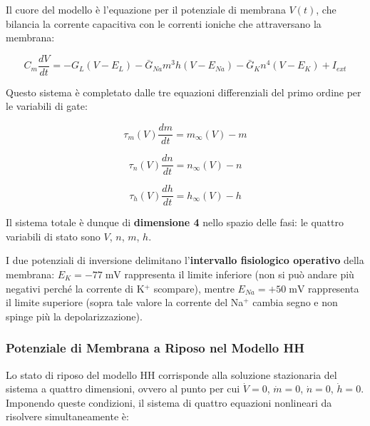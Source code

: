 Il cuore del modello è l'equazione per il potenziale di membrana $V(t)$, che bilancia la corrente capacitiva con le correnti ioniche che attraversano la membrana:

\begin{equation}
C_m \frac{dV}{dt} = -G_L(V - E_L) - \bar{G}_{Na} m^3 h (V - E_{Na}) - \bar{G}_K n^4 (V - E_K) + I_{ext}
\end{equation}

Questo sistema è completato dalle tre equazioni differenziali del primo ordine per le variabili di gate:

\begin{equation}
\tau_m(V) \frac{dm}{dt} = m_\infty(V) - m
\end{equation}

\begin{equation}
\tau_n(V) \frac{dn}{dt} = n_\infty(V) - n
\end{equation}

\begin{equation}
\tau_h(V) \frac{dh}{dt} = h_\infty(V) - h
\end{equation}

Il sistema totale è dunque di \textbf{dimensione 4} nello spazio delle fasi: le quattro variabili di stato sono $V$, $n$, $m$, $h$.



\begin{tcolorbox}[colback=gray!5, colframe=gray!40, arc=2mm, boxrule=0.5pt]
I due potenziali di inversione delimitano l'\textbf{intervallo fisiologico operativo} della membrana: $E_K = -77 \; \text{mV}$ rappresenta il limite inferiore (non si può andare più negativi perché la corrente di K$^+$ scompare), mentre $E_{Na} = +50 \; \text{mV}$ rappresenta il limite superiore (sopra tale valore la corrente del Na$^+$ cambia segno e non spinge più la depolarizzazione).
\end{tcolorbox}

\subsubsection{Potenziale di Membrana a Riposo nel Modello HH}


Lo stato di riposo del modello HH corrisponde alla soluzione stazionaria del sistema a quattro dimensioni, ovvero al punto per cui $\dot{V} = 0$, $\dot{m} = 0$, $\dot{n} = 0$, $\dot{h} = 0$. Imponendo queste condizioni, il sistema di quattro equazioni nonlineari da risolvere simultaneamente è:

